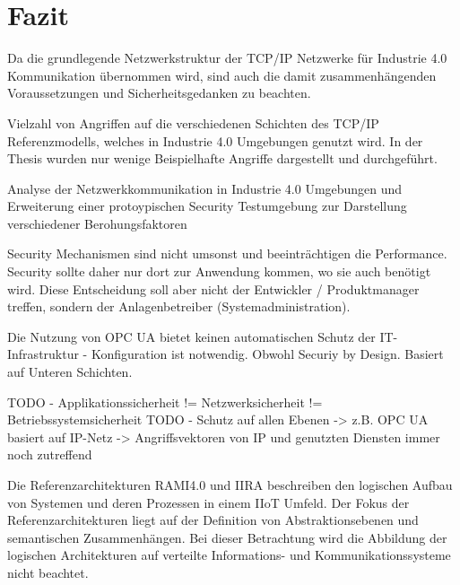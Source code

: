 \chapter{Fazit}
Da die grundlegende Netzwerkstruktur der \ac{TCP}/\ac{IP} Netzwerke für Industrie 4.0 Kommunikation übernommen wird, sind auch die damit zusammenhängenden Voraussetzungen und Sicherheitsgedanken zu beachten. \cite{sichKom2017}

Vielzahl von Angriffen auf die verschiedenen Schichten des \ac{TCP}/\ac{IP} Referenzmodells, welches in Industrie 4.0 Umgebungen genutzt wird.
In der Thesis wurden nur wenige Beispielhafte Angriffe dargestellt und durchgeführt.

Analyse der Netzwerkkommunikation in Industrie 4.0 Umgebungen und Erweiterung einer protoypischen Security Testumgebung zur Darstellung verschiedener Berohungsfaktoren

Security Mechanismen sind nicht umsonst und beeinträchtigen die Performance. Security sollte daher nur dort zur Anwendung kommen, wo sie auch benötigt wird. Diese Entscheidung soll aber nicht der Entwickler / Produktmanager treffen, sondern der Anlagenbetreiber (Systemadministration).

Die Nutzung von \ac{OPC UA} bietet keinen automatischen Schutz der IT-Infrastruktur - Konfiguration ist notwendig. Obwohl Securiy by Design. Basiert auf Unteren Schichten.

TODO - Applikationssicherheit != Netzwerksicherheit != Betriebssystemsicherheit
TODO - Schutz auf allen Ebenen -> z.B. OPC UA basiert auf IP-Netz -> Angriffsvektoren von IP und genutzten Diensten immer noch zutreffend

Die Referenzarchitekturen \ac{RAMI4.0} und \ac{IIRA} beschreiben den logischen Aufbau von Systemen und deren Prozessen in einem \ac{IIoT} Umfeld. Der Fokus der Referenzarchitekturen liegt auf der Definition von Abstraktionsebenen und semantischen Zusammenhängen. Bei dieser Betrachtung wird die Abbildung der logischen Architekturen auf verteilte Informations- und Kommunikationssysteme nicht beachtet. 